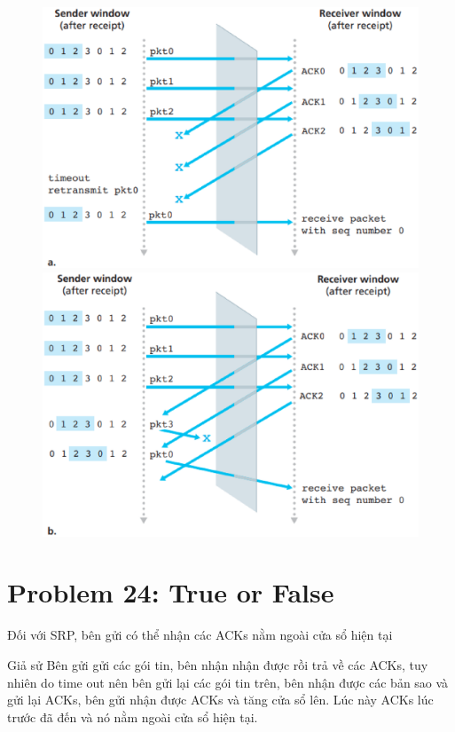 \documentclass[12pt,a4paper]{article}
\begin{document}
\begin{figure}[h]
    \centering
    \includegraphics[scale=0.29]{f327a.eps}
    \includegraphics[scale=0.29]{f327b.eps}
\end{figure}

\newpage
\section*{Problem 24: True or False}


\begin{description}[font=$\bullet$~\normalfont\scshape\color{red!50!black}]
    \item [A True] Đối với SRP, bên gửi có thể nhận các ACKs nằm ngoài cửa sổ hiện tại
\end{description}
Giả sử Bên gửi gửi các gói tin, bên nhận nhận được rồi trả về các ACKs, tuy nhiên do time out nên bên gửi lại các gói tin trên, bên nhận được
các bản sao và gửi lại ACKs, bên gửi nhận được ACKs và tăng cửa sổ lên. Lúc này ACKs lúc trước đã đến và nó nằm ngoài cửa sổ hiện tại.
\end{document}
